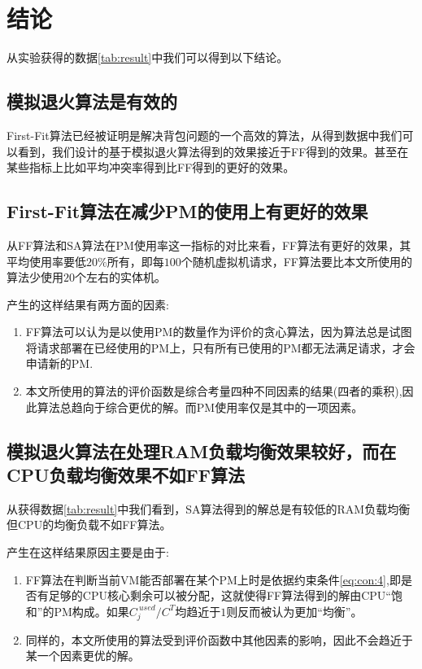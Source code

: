 \section{结论}
从实验获得的数据\ref{tab:result}中我们可以得到以下结论。

\subsection*{模拟退火算法是有效的}

First-Fit算法已经被证明是解决背包问题的一个高效的算法，从得到数据中我们可以看到，我们设计的基于模拟退火算法得到的效果接近于FF得到的效果。甚至在某些指标上比如平均冲突率得到比FF得到的更好的效果。

\subsection*{First-Fit算法在减少PM的使用上有更好的效果}

从FF算法和SA算法在PM使用率这一指标的对比来看，FF算法有更好的效果，其平均使用率要低$20\%$所有，即每$100$个随机虚拟机请求，FF算法要比本文所使用的算法少使用$20$个左右的实体机。

产生的这样结果有两方面的因素:

\begin{enumerate}
\item FF算法可以认为是以使用PM的数量作为评价的贪心算法，因为算法总是试图将请求部署在已经使用的PM上，只有所有已使用的PM都无法满足请求，才会申请新的PM.
\item 本文所使用的算法的评价函数是综合考量四种不同因素的结果(四者的乘积),因此算法总趋向于综合更优的解。而PM使用率仅是其中的一项因素。
\end{enumerate}

\subsection*{模拟退火算法在处理RAM负载均衡效果较好，而在CPU负载均衡效果不如FF算法}
从获得数据\ref{tab:result}中我们看到，SA算法得到的解总是有较低的RAM负载均衡但CPU的均衡负载不如FF算法。

产生在这样结果原因主要是由于:
\begin{enumerate}
\item FF算法在判断当前VM能否部署在某个PM上时是依据约束条件\eqref{eq:con:4},即是否有足够的CPU核心剩余可以被分配，这就使得FF算法得到的解由CPU``饱和''的PM构成。如果$C^{~used}_j/C^T$均趋近于$1$则反而被认为更加``均衡''。
\item 同样的，本文所使用的算法受到评价函数中其他因素的影响，因此不会趋近于某一个因素更优的解。
\end{enumerate}

